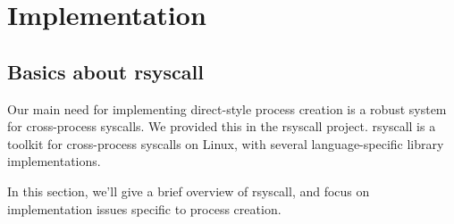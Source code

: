 \documentclass{acmart}
\begin{document}



\section{Implementation}\label{implementation}
\subsection{Basics about rsyscall}
Our main need for implementing direct-style process creation
is a robust system for cross-process syscalls.
We provided this in the rsyscall project.
rsyscall is a toolkit for cross-process syscalls on Linux,
with several language-specific library implementations.

In this section, we'll give a brief overview of rsyscall,
and focus on implementation issues specific to process creation.
\end{document}
